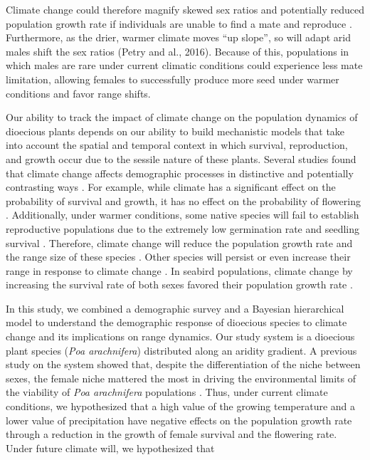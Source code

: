 \documentclass[11pt]{article}
\begin{document}
Climate change could therefore magnify skewed sex ratios and potentially reduced population growth rate if individuals are unable to find a mate and reproduce \citep{morrison2016causes}.
Furthermore, as the drier, warmer climate moves “up slope”, so will adapt arid males shift the sex ratios (Petry and al., 2016).
Because of this, populations in which males are rare under current climatic conditions could experience less mate limitation, allowing females to successfully produce more seed under warmer conditions \citep{petry2016sex} and favor range shifts. 

Our ability to track the impact of climate change on the population dynamics of dioecious plants depends on our ability to build mechanistic models that take into account the spatial and temporal context in which survival, reproduction, and growth occur due to the sessile nature of these plants.
Several studies found that climate change affects demographic processes in distinctive and potentially contrasting ways \citep{dalgleish2011climate}. For example, while climate has a significant effect on the probability of survival and growth, it has no effect on the probability of flowering \citep{greiser2020climate}. Additionally, under warmer conditions, some native species will fail to establish reproductive populations due to the extremely low germination rate and seedling survival \citep{Reed2021}. Therefore, climate change will reduce the population growth rate and the range size of these species \citep{reed2021climate}. 
Other species will persist or even increase their range in response to climate change \citep{williams2015life,merow2017climate}. 
In seabird populations, climate change by increasing the survival rate of both sexes favored their population growth rate \citep{gianuca2019sex}.

In this study, we combined a demographic survey and a Bayesian hierarchical model to understand the demographic response of dioecious species to climate change and its implications on range dynamics.
Our study system is a dioecious plant species (\textit{Poa arachnifera}) distributed along an aridity gradient. 
A previous study on the system showed that, despite the differentiation of the niche between sexes, the female niche mattered the most in driving the environmental limits of the viability of \textit {Poa arachnifera} populations \citep{miller2022two}. 
Thus, under current climate conditions, we hypothesized that a high value of the growing temperature and a lower value of precipitation have negative effects on the population growth rate through a reduction in the growth of female survival and the flowering rate.
Under future climate will, we hypothesized that  
\end{document}
